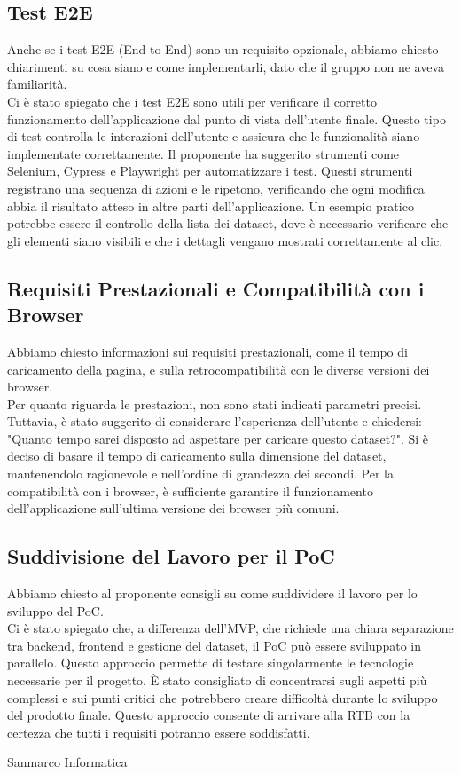 \subsection{Test E2E}
Anche se i test E2E (End-to-End) sono un requisito opzionale, abbiamo chiesto chiarimenti su cosa siano e come implementarli, dato che il gruppo non ne aveva familiarità.\\
Ci è stato spiegato che i test E2E sono utili per verificare il corretto funzionamento dell’applicazione dal punto di vista dell’utente finale. 
Questo tipo di test controlla le interazioni dell’utente e assicura che le funzionalità siano implementate correttamente.
Il proponente ha suggerito strumenti come Selenium, Cypress e Playwright per automatizzare i test. 
Questi strumenti registrano una sequenza di azioni e le ripetono, verificando che ogni modifica abbia il risultato atteso in altre parti dell’applicazione. 
Un esempio pratico potrebbe essere il controllo della lista dei dataset, dove è necessario verificare che gli elementi siano visibili e che i dettagli vengano mostrati correttamente al clic.

\subsection{Requisiti Prestazionali e Compatibilità con i Browser}
Abbiamo chiesto informazioni sui requisiti prestazionali, come il tempo di caricamento della pagina, e sulla retrocompatibilità con le diverse versioni dei browser.\\
Per quanto riguarda le prestazioni, non sono stati indicati parametri precisi. 
Tuttavia, è stato suggerito di considerare l’esperienza dell’utente e chiedersi: "Quanto tempo sarei disposto ad aspettare per caricare questo dataset?". 
Si è deciso di basare il tempo di caricamento sulla dimensione del dataset, mantenendolo ragionevole e nell’ordine di grandezza dei secondi.
Per la compatibilità con i browser, è sufficiente garantire il funzionamento dell’applicazione sull’ultima versione dei browser più comuni.

\subsection{Suddivisione del Lavoro per il PoC}
Abbiamo chiesto al proponente consigli su come suddividere il lavoro per lo sviluppo del PoC. \\
Ci è stato spiegato che, a differenza dell’MVP, che richiede una chiara separazione tra backend, frontend e gestione del dataset, il PoC può essere sviluppato in parallelo. 
Questo approccio permette di testare singolarmente le tecnologie necessarie per il progetto.
È stato consigliato di concentrarsi sugli aspetti più complessi e sui punti critici che potrebbero creare difficoltà durante lo sviluppo del prodotto finale. 
Questo approccio consente di arrivare alla RTB con la certezza che tutti i requisiti potranno essere soddisfatti.

\hfill\signature{Approvazione esterna}{Sanmarco Informatica}
